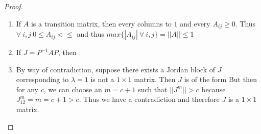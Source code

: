 \documentclass{amsart}
\theoremstyle{definition}
\theoremstyle{remark}
\numberwithin{equation}{section}
\begin{document}
\begin{proof}

\begin{enumerate}
	\item 
		If $A$ is a transition matrix, then every columns to $1$ and every $A_{ij} \geq 0$.
		Thus $\forall\ i, j\ 0 \leq A_{ij} < \leq $ and thus $ max \{|A_{ij}|\ \forall\ i, j \} = ||A|| \leq 1$

	\item
		If $J = P^{-1}AP$, then 

	\item 
		By way of contradiction, suppose there exists a  Jordan block of $J$ corresponding to $\lambda = 1$ is not a $1 \times 1 $ matrix.
		Then $J$ is of the form 
		But then for any $c$, we can choose an $m = c +1$ such that $||J^m|| > c$ because $J_{12}^m = m = c+1 > c$.
		Thus we have a contradiction and therefore $J$ is a $1 \times 1$ matrix.


\end{enumerate}


\begin{comment}



	We know that $A$ has eigenvalue $1$ by Theorem 5.17 \cite{friedberg2003linear} and the characteristic polynomial of $A$ splits because $C$ is an algebraically closed field. 


	Thus by Theorem 7.4 \cite{friedberg2003linear}, we know $\forall\ 1 \leq i \leq k$, $dim(K_{1})$ is the multiplicity of $1$ as an eigenvalue of $A$.
	Additionally, we know $E_{\lambda} \subseteq K_{\lambda}$ by Theorem 7.1.

	But if each Jordan block of $J$ corresponding to the eigenvalue $\lambda = 1$ is a $1 \times 1$ matrix, then $dim(K_1) = 1$.
	But if $E_{\lambda} \subseteq K_1$, then $dim(E_{\lambda}) = 1$.	






\end{comment}

\end{proof}
\end{document}
